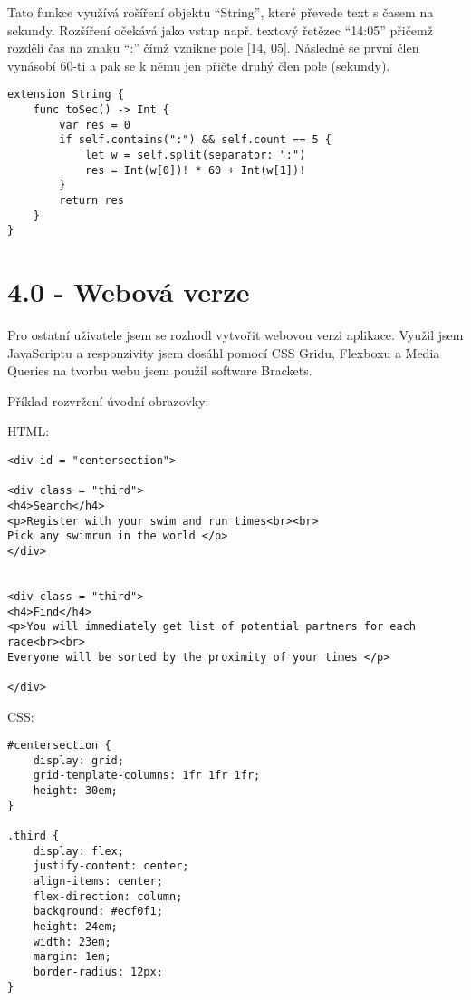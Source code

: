 \documentclass{article}
\begin{document}
\vspace{10 mm}
Tato funkce využívá rošíření objektu “String”, které převede text s časem na sekundy. Rozšíření očekává jako vstup např. textový řetězec “14:05” přičemž rozdělí čas na znaku “:” čímž vznikne pole [14, 05]. Následně se první člen vynásobí 60-ti a pak se k němu jen přičte druhý člen pole (sekundy).

\vspace{10 mm}

\begin{verbatim}
extension String {
    func toSec() -> Int {
        var res = 0
        if self.contains(":") && self.count == 5 {
            let w = self.split(separator: ":")
            res = Int(w[0])! * 60 + Int(w[1])!
        }
        return res
    }
}

\end{verbatim}



\vspace{10 mm}
\section{4.0 - Webová verze}

Pro ostatní uživatele jsem se rozhodl vytvořit webovou verzi aplikace. Využil jsem JavaScriptu a responzivity jsem dosáhl pomocí CSS Gridu, Flexboxu a Media Queries na tvorbu webu jsem použil software Brackets. 

\vspace{5 mm}
Příklad rozvržení úvodní obrazovky:
\vspace{8 mm}

HTML:
\vspace{5 mm}
\begin{verbatim}
<div id = "centersection">
    
<div class = "third">
<h4>Search</h4>
<p>Register with your swim and run times<br><br>
Pick any swimrun in the world </p>
</div>
    

<div class = "third">
<h4>Find</h4>
<p>You will immediately get list of potential partners for each race<br><br>
Everyone will be sorted by the proximity of your times </p>    

</div>
\end{verbatim}

\vspace{10 mm}
CSS: 

\begin{verbatim}
#centersection {
	display: grid;
	grid-template-columns: 1fr 1fr 1fr;
	height: 30em;
}

.third {
	display: flex;
	justify-content: center;
	align-items: center;
	flex-direction: column;
	background: #ecf0f1;
	height: 24em;
	width: 23em;
	margin: 1em;
	border-radius: 12px;
}
\end{verbatim}
\end{document}
